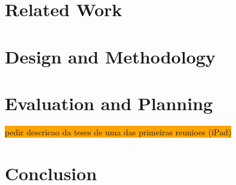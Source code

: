 \documentclass[runningheads]{llncs}
\begin{document}
\section{Related Work}
\label{sec:Related Work}


\section{Design and Methodology}
\label{sec:Design and Methodology}












\section{Evaluation and Planning}
\label{sec:Evaluation and Planning}
\colorbox{orange}{pedir descricao da teses de uma das primeiras reunioes (iPad)}

\section{Conclusion}
\label{sec:Conclusion}


%
%

%
%
%
% 
% 
%


\end{document}
